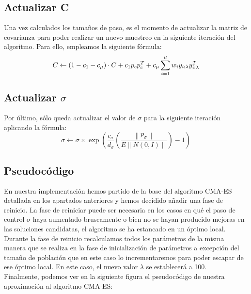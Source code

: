 \subsection{Actualizar C}
Una vez calculados los tamaños de paso, es el momento de actualizar la matriz de covarianza para poder realizar un nuevo muestreo en la siguiente iteración del algoritmo. Para ello, empleamos la siguiente fórmula:
\begin{equation} \label{eq:5}
    C \leftarrow (1 - c_{1} - c_{\mu})\cdot C + c_{1}p_{c}p_{c}^{T} + c_{\mu} \sum_{i=1}^{\mu} w_{i}y_{i:\lambda}y_{i:\lambda}^{T} \\
\end{equation}

\subsection{Actualizar $ \sigma $}
Por último, sólo queda actualizar el valor de $\sigma$ para la siguiente iteración aplicando la fórmula:  
\begin{equation} \label{eq:6}
     \sigma\leftarrow\sigma \times \exp(\frac{c_{\sigma}}{d_{\sigma}} (\frac{\left \| p_{\sigma}\right\|}{E \left \|N(0, I)\right \|}) - 1)
\end{equation}

\subsection{Pseudocódigo}

En nuestra implementación hemos partido de la base del algoritmo CMA-ES detallada en los apartados anteriores y hemos decidido añadir una fase de reinicio. La fase de reiniciar puede ser necesaria en los casos en qué el paso de control $\sigma$ haya aumentado bruscamente o bien no se hayan producido mejoras en las soluciones candidatas, el algoritmo se ha estancado en un óptimo local. \\

Durante la fase de reinicio recalculamos todos los parámetros de la misma manera que se realiza en la fase de inicialización de parámetros a excepción del tamaño de población que en este caso lo incrementaremos para poder escapar de ese óptimo local. En este caso, el nuevo valor $\lambda$ se establecerá a 100. \\

Finalmente, podemos ver en la siguiente figura el pseudocódigo de nuestra aproximación al algoritmo CMA-ES:


\newpage
